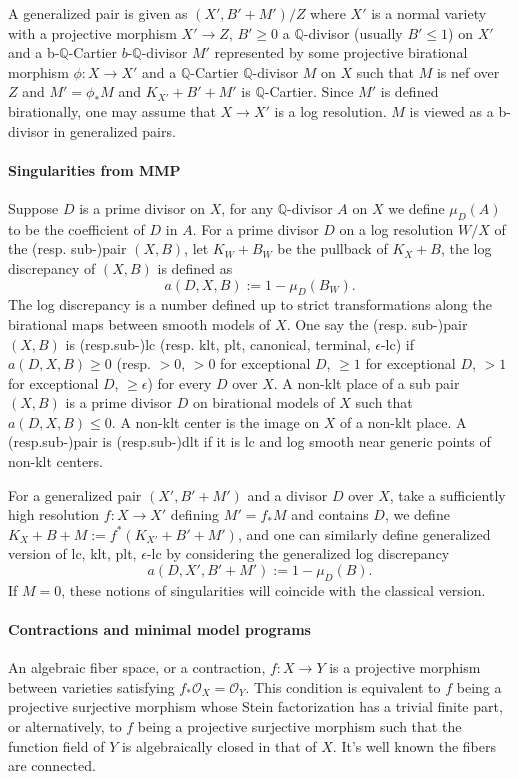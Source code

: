 \documentclass[letterpaper,reqno,12pt]{amsart}
\newcommand{\tbf}{\textbf}
\numberwithin{equation}{section}
\theoremstyle{plain}
\begin{document}
A generalized pair is given as $(X',B'+M')/Z$ where $X'$ is a normal variety with a projective morphism $X'\to Z$, $B'\geq0$ a $\mathbb Q$-divisor (usually $B'\leq 1$) on $X'$ and a b-$\mathbb Q$-Cartier $b$-$\mathbb Q$-divisor $M'$ represented by some projective birational morphism $\phi:X\to X'$ and a $\mathbb Q$-Cartier $\mathbb Q$-divisor $M$ on $X$ such that $M$ is nef over $Z$ and $M'=\phi_*M$ and $K_{X'}+B'+M'$ is $\mathbb Q$-Cartier. Since $M'$ is defined birationally, one may assume that $X\to X'$ is a log resolution. $M$ is viewed as a b-divisor in generalized pairs.

\paragraph{\tbf{Singularities from MMP}}
Suppose $D$ is a prime divisor on $X$, for any $\mathbb Q$-divisor $A$ on $X$ we define $\mu_D(A)$ to be the coefficient of $D$ in $A$. For a prime divisor $D$ on a log resolution $W/X$ of the (resp. sub-)pair $(X,B)$, let $K_W+B_W$ be the pullback of $K_X+B$, the log discrepancy of $(X,B)$ is defined as \[a(D,X,B):=1-\mu_D(B_W).\]The log discrepancy is a number defined up to strict transformations along the birational maps between smooth models of $X$. One say the (resp. sub-)pair $(X,B)$ is (resp.sub-)lc (resp. klt, plt, canonical, terminal, $\epsilon$-lc) if $a(D,X,B)\geq 0$ (resp. $>0$, $>0$ for exceptional $D$, $\geq 1$ for exceptional $D$, $>1$ for exceptional $D$, $\geq\epsilon$) for every $D$ over $X$. A non-klt place of a sub pair $(X,B)$ is a prime divisor $D$ on birational models of $X$ such that $a(D,X,B)\leq0$. A non-klt center is the image on $X$ of a non-klt place. A (resp.sub-)pair is (resp.sub-)dlt if it is lc and log smooth near generic points of non-klt centers.

For a generalized pair $(X',B'+M')$ and a divisor $D$ over $X$, take a sufficiently high resolution $f:X\to X'$ defining $M'=f_*M$ and contains $D$, we define $K_X+B+M:=f^*(K_{X'}+B'+M')$, and one can similarly define generalized version of lc, klt, plt, $\epsilon$-lc by considering the generalized log discrepancy \[a(D,X',B'+M'):=1-\mu_D(B).\]If $M=0$, these notions of singularities will coincide with the classical version.

\paragraph{\tbf{Contractions and minimal model programs}}
An algebraic fiber space, or a contraction, $f:X\to Y$ is a projective morphism  between varieties satisfying $f_* \mathcal O_X=\mathcal O_Y$. This condition is equivalent to $f$ being a projective surjective morphism whose Stein factorization has a trivial finite part, or alternatively, to $f$ being a projective surjective morphism such that the function field of $Y$ is algebraically closed in that of $X$. It's well known the fibers are connected.
\end{document}
